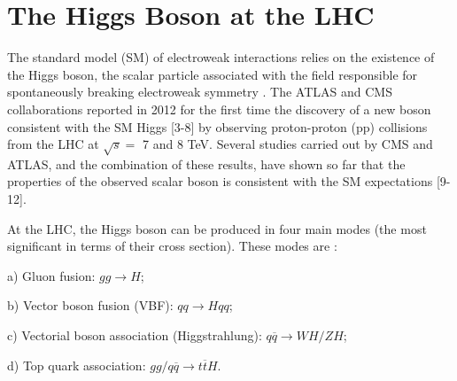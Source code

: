 \section{The Higgs Boson at the LHC}
The standard model (SM) of electroweak interactions relies on the existence of the Higgs boson, the scalar particle associated with the field responsible for spontaneously breaking electroweak symmetry \cite{bib:PhysRev22-579-1961,bib:PhysRevLett19-1264-1967}. The ATLAS and CMS collaborations reported in 2012 for the first time the discovery of a new boson consistent with the SM Higgs [3-8] by observing proton-proton (pp) collisions from the LHC at $\sqrt{s}=$ 7 and 8 TeV. Several studies carried out by CMS and ATLAS, and the combination of these results, have shown so far that the properties of the observed scalar boson is consistent with the SM expectations [9-12]. 

At the LHC, the Higgs boson can be produced in four main modes (the most significant in terms of their cross section). These modes are \cite{bib:ellis-2003}:

\begin{flushleft}
	\quad a) Gluon fusion: $gg \rightarrow H$;
	
	\quad b) Vector boson fusion (VBF): $qq \rightarrow Hqq$;
	
	\quad c) Vectorial boson association (Higgstrahlung): $q \overline{q} \rightarrow WH/ZH$;
	
	\quad d) Top quark association: $gg/q \overline{q} \rightarrow t \overline{t} H$.
\end{flushleft}

